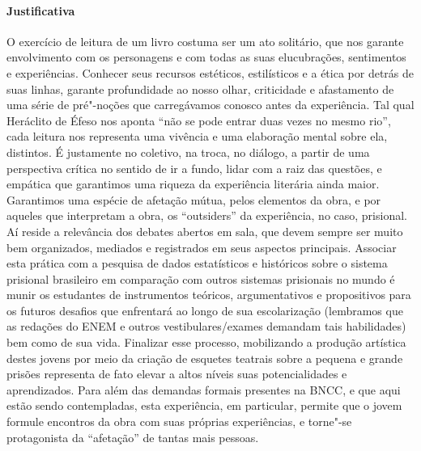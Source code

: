 \documentclass[11pt]{extarticle}
\begin{document}
\paragraph{Justificativa} O exercício de leitura de um livro costuma ser
um ato solitário, que nos garante envolvimento com os personagens e com
todas as suas elucubrações, sentimentos e experiências. Conhecer seus
recursos estéticos, estilísticos e a ética por detrás de suas linhas,
garante profundidade ao nosso olhar, criticidade e afastamento de uma
série de pré"-noções que carregávamos conosco antes da experiência. Tal
qual Heráclito de Éfeso nos aponta ``não se pode entrar duas vezes no
mesmo rio'', cada leitura nos representa uma vivência e uma elaboração
mental sobre ela, distintos. É justamente no coletivo, na troca, no
diálogo, a partir de uma perspectiva crítica no sentido de ir a fundo,
lidar com a raiz das questões, e empática que garantimos uma riqueza da
experiência literária ainda maior. Garantimos uma espécie de afetação
mútua, pelos elementos da obra, e por aqueles que interpretam a obra, os
``outsiders'' da experiência, no caso, prisional. Aí reside a relevância
dos debates abertos em sala, que devem sempre ser muito bem organizados,
mediados e registrados em seus aspectos principais. Associar esta
prática com a pesquisa de dados estatísticos e históricos sobre o
sistema prisional brasileiro em comparação com outros sistemas
prisionais no mundo é munir os estudantes de instrumentos teóricos,
argumentativos e propositivos para os futuros desafios que enfrentará ao
longo de sua escolarização (lembramos que as redações do ENEM e outros
vestibulares/exames demandam tais habilidades) bem como de sua vida.
Finalizar esse processo, mobilizando a produção artística destes jovens
por meio da criação de esquetes teatrais sobre a pequena e grande
prisões representa de fato elevar a altos níveis suas potencialidades e
aprendizados. Para além das demandas formais presentes na BNCC, e que
aqui estão sendo contempladas, esta experiência, em particular, permite
que o jovem formule encontros da obra com suas próprias experiências, e
torne"-se protagonista da ``afetação'' de tantas mais pessoas.

\end{document}
